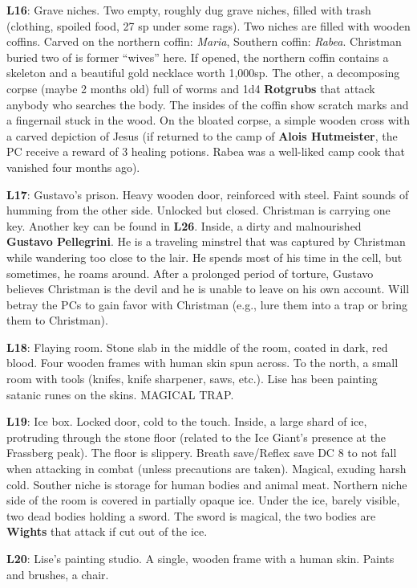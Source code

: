 \documentclass[
]{book}
\begin{document}
\textbf{L16}: Grave niches. Two empty, roughly dug grave niches, filled with trash (clothing, spoiled food, 27 sp under some rags). Two niches are filled with wooden coffins. Carved on the northern coffin: \emph{Maria}, Southern coffin: \emph{Rabea}. Christman buried two of is former ``wives'' here. If opened, the northern coffin contains a skeleton and a beautiful gold necklace worth 1,000sp. The other, a decomposing corpse (maybe 2 months old) full of worms and 1d4 \textbf{Rotgrubs} that attack anybody who searches the body. The insides of the coffin show scratch marks and a fingernail stuck in the wood. On the bloated corpse, a simple wooden cross with a carved depiction of Jesus (if returned to the camp of \textbf{Alois Hutmeister}, the PC receive a reward of 3 healing potions. Rabea was a well-liked camp cook that vanished four months ago).

\textbf{L17}: Gustavo's prison. Heavy wooden door, reinforced with steel. Faint sounds of humming from the other side. Unlocked but closed. Christman is carrying one key. Another key can be found in \textbf{L26}. Inside, a dirty and malnourished \textbf{Gustavo Pellegrini}. He is a traveling minstrel that was captured by Christman while wandering too close to the lair. He spends most of his time in the cell, but sometimes, he roams around. After a prolonged period of torture, Gustavo believes Christman is the devil and he is unable to leave on his own account. Will betray the PCs to gain favor with Christman (e.g., lure them into a trap or bring them to Christman).

\textbf{L18}: Flaying room. Stone slab in the middle of the room, coated in dark, red blood. Four wooden frames with human skin spun across. To the north, a small room with tools (knifes, knife sharpener, saws, etc.). Lise has been painting satanic runes on the skins. MAGICAL TRAP.

\textbf{L19}: Ice box. Locked door, cold to the touch. Inside, a large shard of ice, protruding through the stone floor (related to the Ice Giant's presence at the Frassberg peak). The floor is slippery. Breath save/Reflex save DC 8 to not fall when attacking in combat (unless precautions are taken). Magical, exuding harsh cold. Souther niche is storage for human bodies and animal meat. Northern niche side of the room is covered in partially opaque ice. Under the ice, barely visible, two dead bodies holding a sword. The sword is magical, the two bodies are \textbf{Wights} that attack if cut out of the ice.

\textbf{L20}: Lise's painting studio. A single, wooden frame with a human skin. Paints and brushes, a chair.
\end{document}
